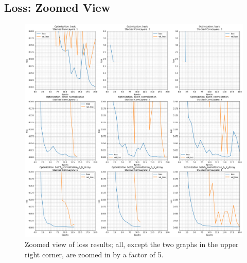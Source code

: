 \documentclass{article}
\begin{document}
\subsection{Loss: Zoomed View}
\begin{figure}[h]
    \centering
    \centerline{
        \includegraphics[width=0.65\paperwidth]{loss_zoomed}
    }
    \caption{Zoomed view of loss results; all, except the two graphs in the upper right corner, are zoomed in by a factor of 5.}
    \label{fig:loss_zoomed}
\end{figure}

\newpage
\end{document}
